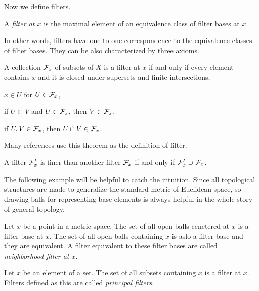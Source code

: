 \documentclass{../crs}
\begin{document}
Now we define filters.

\begin{defn}
A \emph{filter at $x$} is the maximal element of an equivalence class of filter bases at $x$.
\end{defn}

In other words, filters have one-to-one correspondence to the equivalence classes of filter bases.
They can be also characterized by three axioms.

\begin{thm}
A collection $\mathcal{F}_x$ of subsets of $X$ is a filter at $x$ if and only if every element contains $x$ and it is closed under supersets and finite intersections;
\begin{cond}
\item $x\in U$ for $U\in\mathcal{F}_x$,
\item if $U\subset V$ and $U\in\mathcal{F}_x$, then $V\in\mathcal{F}_x$,
\item if $U,V\in\mathcal{F}_x$, then $U\cap V\in\mathcal{F}_x$.
\end{cond}
\end{thm}
\begin{pf}

\end{pf}

Many references use this theorem as the definition of filter.

\begin{thm}
A filter $\mathcal{F}'_x$ is finer than another filter $\mathcal{F}_x$ if and only if $\mathcal{F}'_x\supset\mathcal{F}_x$.
\end{thm}

The following example will be helpful to catch the intuition.
Since all topological structures are made to generalize the standard metric of Euclidean space, so drawing balls for representing base elements is always helpful in the whole story of general topology.

\begin{ex}
Let $x$ be a point in a metric space.
The set of all open balls cenetered at $x$ is a filter base at $x$.
The set of all open balls containing $x$ is aslo a filter base and they are equivalent.
A filter equivalent to these filter bases are called \emph{neighborhood filter at $x$}.
\end{ex}
\begin{ex}
Let $x$ be an element of a set.
The set of all subsets containing $x$ is a filter at $x$.
Filters defined as this are called \emph{principal filters}.
\end{ex}
\end{document}
